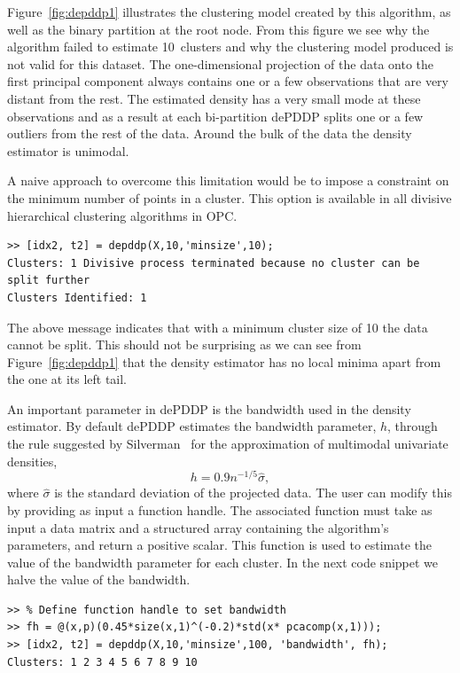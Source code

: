 \documentclass{book}
\begin{document}
Figure~\ref{fig:depddp1} illustrates the clustering model created by this
algorithm, as well as the binary partition at the root node. From this figure
we see why the algorithm failed to estimate 10~clusters and why the clustering
model produced is not valid for this dataset.
%
The one-dimensional projection of the data onto the first principal component 
always contains one or a few
observations that are very distant from the rest. The estimated density
has a very small mode at these observations and as a result at each
bi-partition dePDDP splits one or a few outliers from the rest of the
data. Around the bulk of the data the density estimator is unimodal.

A naive approach to overcome this limitation would be to impose
a constraint on the minimum number of points in a cluster. This option
is available in all divisive hierarchical clustering algorithms in OPC.

\begin{verbatim}
>> [idx2, t2] = depddp(X,10,'minsize',10);
Clusters: 1 Divisive process terminated because no cluster can be split further
Clusters Identified: 1
\end{verbatim}

\noindent
%
The above message indicates that with a minimum cluster size of 10 the
data cannot be split.
%
This should not be surprising as we can see from Figure~\ref{fig:depddp1}
that the density estimator has no local minima apart from the one at its left tail.
%

An important parameter in dePDDP is the bandwidth used in the density
estimator. By default dePDDP estimates the bandwidth
parameter, $h$, through the rule suggested by Silverman~\cite{Silverman1986}
for the approximation of multimodal univariate densities,
%
\[
h = 0.9 n^{-1/5} \hat{\sigma}, 
\]
%
where $\hat{\sigma}$ is the standard deviation of the projected data.
%
The user can modify this by providing as input a function handle.
The associated function must take as input a data matrix and a structured array
containing the algorithm's parameters, and return a positive scalar. This function
is used to estimate the value of the bandwidth parameter for each cluster.
In the next code snippet we halve the value of the bandwidth.

\begin{verbatim}
>> % Define function handle to set bandwidth
>> fh = @(x,p)(0.45*size(x,1)^(-0.2)*std(x* pcacomp(x,1)));
>> [idx2, t2] = depddp(X,10,'minsize',100, 'bandwidth', fh);
Clusters: 1 2 3 4 5 6 7 8 9 10
\end{verbatim}
%
\end{document}

